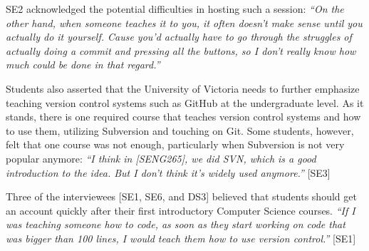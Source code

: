 
SE2 acknowledged the potential difficulties in hosting such a session: \textit{``On the other hand, when someone teaches it to you, it often doesn't make sense until you actually do it yourself. Cause you'd actually have to go through the struggles of actually doing a commit and pressing all the buttons, so I don't really know how much could be done in that regard.''}

Students also asserted that the University of Victoria needs to further emphasize teaching version control systems such as GitHub at the undergraduate level. As it stands, there is one required course that teaches version control systems and how to use them, utilizing Subversion and touching on Git. Some students, however, felt that one course was not enough, particularly when Subversion is not very popular anymore: \textit{``I think in [SENG265], we did SVN, which is a good introduction to the idea. But I don't think it's widely used anymore.''} [SE3]



Three of the interviewees [SE1, SE6, and DS3] believed that students should get an account quickly after their first introductory Computer Science courses. \textit{``If I was teaching someone how to code, as soon as they start working on code that was bigger than 100 lines, I would teach them how to use version control.''} [SE1]

